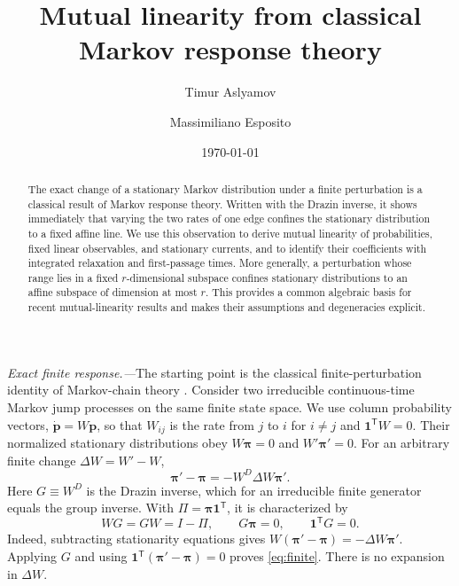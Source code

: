 \documentclass[
  reprint,
  superscriptaddress,
  amsmath,
  amssymb,
  aps,
  pre,
  longbibliography
]{revtex4-2}
\begin{document}
\title{Mutual linearity from classical Markov response theory}

\author{Timur Aslyamov}

\author{Massimiliano Esposito}

\date{\today}


\begin{abstract}
The exact change of a stationary Markov distribution under a finite
perturbation is a classical result of Markov response theory. Written with
the Drazin inverse, it shows immediately that varying the two rates of
one edge confines the stationary distribution to a fixed affine line.
We use this observation to derive mutual linearity of probabilities,
fixed linear observables, and stationary currents, and to identify their
coefficients with integrated relaxation and first-passage times.
More generally, a perturbation whose range lies in a fixed
$r$-dimensional subspace confines stationary distributions to an affine
subspace of dimension at most $r$. This provides a common algebraic
basis for recent mutual-linearity results and makes their assumptions
and degeneracies explicit.
\end{abstract}
\maketitle

\textit{Exact finite response.---}The starting point is the classical
finite-perturbation identity of Markov-chain theory
\cite{Schweitzer1968,Meyer1975,Meyer1980}. Consider two irreducible
continuous-time Markov jump processes on the same finite state space.
We use column probability vectors, $\dot{\bm p}=W\bm p$, so that
$W_{ij}$ is the rate from $j$ to $i$ for $i\ne j$ and
$\bm 1^{\mathsf T}W=0$. Their normalized stationary distributions
obey $W\bm\pi=0$ and $W'\bm\pi'=0$. For an arbitrary finite
change $\Delta W=W'-W$,
\begin{equation}
 \boxed{\bm\pi'-\bm\pi=-W^D\Delta W\bm\pi'.}
 \label{eq:finite}
\end{equation}
Here $G\equiv W^D$ is the Drazin inverse, which for an irreducible
finite generator equals the group inverse. With
$\Pi=\bm\pi\bm 1^{\mathsf T}$, it is characterized by
\begin{equation}
 WG=GW=I-\Pi,\qquad G\bm\pi=0,\qquad
 \bm 1^{\mathsf T}G=0.
 \label{eq:group}
\end{equation}
Indeed, subtracting stationarity equations gives
$W(\bm\pi'-\bm\pi)=-\Delta W\bm\pi'$. Applying $G$ and using
$\bm 1^{\mathsf T}(\bm\pi'-\bm\pi)=0$ proves
\cref{eq:finite}. There is no expansion in $\Delta W$.
\end{document}
